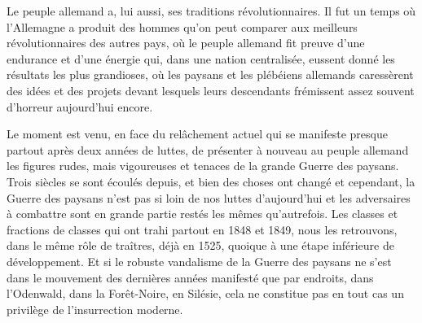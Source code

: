 \documentclass[french,twoside]{book} %
\newcommand{\astertri}{\medskip\par\centerline{\color{rubric}\large\selectfont{\syms ✻\,✻\,✻}}\medskip\par}%
\newcommand\chaptercont{} %
\begin{document}
\chaptercont
\noindent Le peuple allemand a, lui aussi, ses traditions révolutionnaires. Il fut un temps où l’Allemagne a produit des hommes qu’on peut comparer aux meilleurs révolutionnaires des autres pays, où le peuple allemand fit preuve d’une endurance et d’une énergie qui, dans une nation centralisée, eussent donné les résultats les plus grandioses, où les paysans et les plébéiens allemands caressèrent des idées et des projets devant lesquels leurs descendants frémissent assez souvent d’horreur aujourd’hui encore.\par
Le moment est venu, en face du relâchement actuel qui se manifeste presque partout après deux années de luttes, de présenter à nouveau au peuple allemand les figures rudes, mais vigoureuses et tenaces de la grande Guerre des paysans. Trois siècles se sont écoulés depuis, et bien des choses ont changé et cependant, la Guerre des paysans n’est pas si loin de nos luttes d’aujourd’hui et les adversaires à combattre sont en grande partie restés les mêmes qu’autrefois. Les classes et fractions de classes qui ont trahi partout en 1848 et 1849, nous les retrouvons, dans le même rôle de traîtres, déjà en 1525, quoique à une étape inférieure de développement. Et si le robuste vandalisme de la Guerre des paysans ne s’est dans le mouvement des dernières années manifesté que par endroits, dans l’Odenwald, dans la Forêt-Noire, en Silésie, cela ne constitue pas en tout cas un privilège de l’insurrection moderne.\par

\astertri
\end{document}
